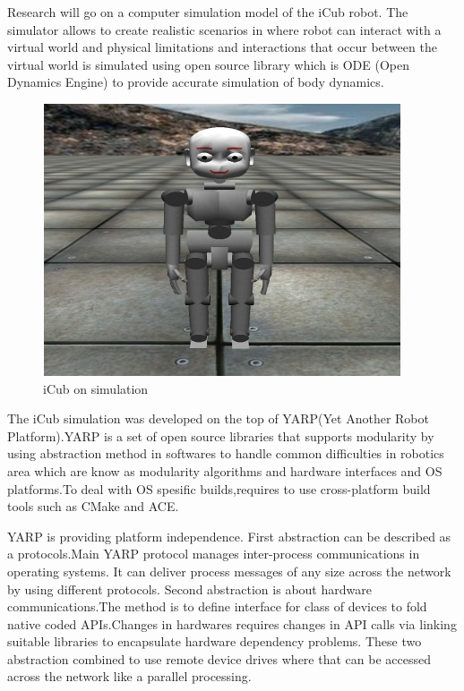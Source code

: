 \documentclass[12pt]{report}
\begin{document}
Research will go on a computer simulation model of the iCub robot. The simulator allows to create realistic scenarios in where robot can interact with a virtual world and physical limitations and interactions that occur between the virtual world is simulated using open source library which is ODE (Open Dynamics Engine) to provide accurate simulation of body dynamics. 
\begin{figure}[!h]
\begin{center}
\includegraphics[scale=1.3]{iCubSim.jpg}
\caption{iCub on simulation}
\end{center}
\end{figure}
The iCub simulation was developed on the top of YARP(Yet Another Robot Platform)\cite{yarp}.YARP is a set of open source libraries that supports modularity by using abstraction method in softwares to handle common difficulties in robotics area which are know as modularity algorithms and hardware interfaces and OS platforms.To deal with OS spesific builds,requires to use cross-platform build tools such as CMake\cite{cmake} and ACE\cite{ace}.

YARP is providing platform independence. First abstraction can be described as a protocols.Main YARP protocol manages inter-process communications in operating systems. It can deliver process messages of any size across the network by using different protocols.
\newpage
Second abstraction is about hardware communications.The method is to define interface for class of devices to fold native coded APIs.Changes in hardwares requires changes in API calls via linking suitable libraries to encapsulate hardware dependency problems. 
These two abstraction combined to use remote device drives where that can be accessed across the network like a parallel processing.
\end{document}
